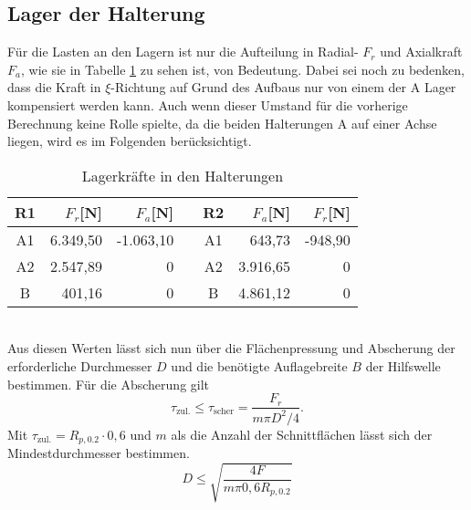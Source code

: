 \subsection{Lager der Halterung}
Für die Lasten an den Lagern ist nur die Aufteilung in Radial- $F_r$ und Axialkraft $F_a$, wie sie in Tabelle \ref{tab_lagerkraefte} zu sehen ist, von Bedeutung. Dabei sei noch zu bedenken, dass die Kraft in $\xi$-Richtung auf Grund des Aufbaus nur von einem der A Lager kompensiert werden kann. Auch wenn dieser Umstand für die vorherige Berechnung keine Rolle spielte, da die beiden Halterungen A auf einer Achse liegen, wird es im Folgenden berücksichtigt.
\begin{table}[h] 
	\centering 
	\begin{tabular}{c|r|rc||c|r|r} 
		\textbf{R1}&$F_{r}$[N]&$F_a$[N]&&\textbf{R2}&$F_{a}$[N]&$F_r$[N]\\ 
		\hline 
		A1& 6.349,50&-1.063,10&&A1&643,73&-948,90\\
		A2&2.547,89&0&&A2&3.916,65&0\\
		B&401,16&0&&B&4.861,12&0\\
	\end{tabular}
	\caption{Lagerkräfte in den Halterungen}
	\label{tab_lagerkraefte}
\end{table} \\
Aus diesen Werten lässt sich nun über die Flächenpressung und Abscherung der erforderliche Durchmesser $D$ und die benötigte Auflagebreite $B$ der Hilfswelle bestimmen. Für die Abscherung gilt
\begin{equation}
	\tau_{\mathrm{zul.}}\leq\tau_\mathrm{scher}=\frac{F_r}{m\pi D^2/4}.
\end{equation}
Mit $\tau_{\mathrm{zul.}}=R_{p, 0.2}\cdot 0,6$ \cite{metall} und $m$ als die Anzahl der Schnittflächen lässt sich der Mindestdurchmesser bestimmen.
\begin{equation}
	D \leq \sqrt{\frac{4F}{m\pi 0,6 R_{p, 0.2}}}
\end{equation}
